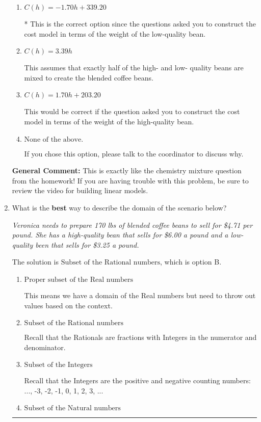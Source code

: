 \documentclass{extbook}[14pt]
\newcommand{\litem}[1]{\item #1

\rule{\textwidth}{0.4pt}}
\begin{document}
\begin{enumerate}
{\begin{enumerate}[label=\Alph*.]
This models the cost of the low-quality bean only, not the blended beans.
\item \( C(h) = -1.70 h + 339.20 \)

* This is the correct option since the questions asked you to construct the cost model in terms of the weight of the low-quality bean.
\item \( C(h) = 3.39 h \)

This assumes that exactly half of the high- and low- quality beans are mixed to create the blended coffee beans.
\item \( C(h) = 1.70 h + 203.20 \)

This would be correct if the question asked you to construct the cost model in terms of the weight of the high-quality bean.
\item \( \text{None of the above.} \)

If you chose this option, please talk to the coordinator to discuss why.
\end{enumerate}

\textbf{General Comment:} This is exactly like the chemistry mixture question from the homework! If you are having trouble with this problem, be sure to review the video for building linear models.
}
\litem{
What is the \textbf{best} way to describe the domain of the scenario below?

\begin{center}
    \textit{ Veronica needs to prepare 170 lbs of blended coffee beans to sell for \$4.71 per pound. She has a high-quality bean that sells for \$6.00 a pound and a low-quality been that sells for \$3.25 a pound. }
\end{center}
The solution is \( \text{Subset of the Rational numbers} \), which is option B.\begin{enumerate}[label=\Alph*.]
\item \( \text{Proper subset of the Real numbers} \)

This means we have a domain of the Real numbers but need to throw out values based on the context.
\item \( \text{Subset of the Rational numbers} \)

Recall that the Rationals are fractions with Integers in the numerator and denominator.
\item \( \text{Subset of the Integers} \)

Recall that the Integers are the positive and negative counting numbers: ..., -3, -2, -1, 0, 1, 2, 3, ... 
\item \( \text{Subset of the Natural numbers} \)


\end{enumerate}}
\end{enumerate}
\end{document}
